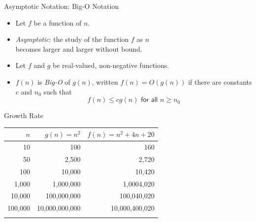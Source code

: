 \documentclass[14pt,aspectratio=1610]{beamer}
\begin{document}
\begin{frame}{Asymptotic Notation: Big-O Notation}
\begin{itemize}
  \item
    Let $f$ be a function of $n$.
  \item
    \emph{Asymptotic}: the study of the function $f$ as $n$ \\
    becomes larger and larger without bound.
  \item
    Let $f$ and $g$ be real-valued, non-negative functions.
  \item
    $f(n)$ is \emph{Big-O} of $g(n)$, written $f(n) = O(g(n))$ if there are constants $c$ and $n_0$ such that
     \begin{equation*}
      f(n) \le cg(n) \textsf{ for all } n \ge n_0
    \end{equation*}
\end{itemize}
\end{frame}

\begin{frame}{Growth Rate}
\begin{table}[]
{\rmfamily%
\begin{tabular}{rrr}
\toprule{}
  \(n\) & $g(n) = n^2$ & $f(n) = n^2 + 4n + 20$\\
\midrule{}
     10  &            100 &            160\\
     50  &          2,500 &          2,720\\
    100  &         10,000 &         10,420\\
  1,000  &      1,000,000 &     1,0004,020\\
 10,000  &    100,000,000 &    100,040,020\\
100,000  & 10,000,000,000 & 10,000,400,020\\
\bottomrule{}
\end{tabular}%
}%
\end{table}
\end{frame}
\end{document}
